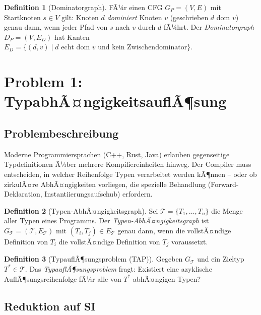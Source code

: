 ﻿\documentclass[a4paper,12pt]{article}
\theoremstyle{definition}
\newtheorem{definition}{Definition}
\begin{document}
\begin{definition}[Dominatorgraph]
\label{def:dom}
FÃ¼r einen CFG $G_P = (V, E)$ mit Startknoten $s \in V$ gilt: Knoten $d$ \emph{dominiert} Knoten $v$ (geschrieben $d \text{ dom } v$) genau dann, wenn jeder Pfad von $s$ nach $v$ durch $d$ fÃ¼hrt. Der \emph{Dominatorgraph} $D_P = (V, E_D)$ hat Kanten $E_D = \{(d, v) \mid d \text{ echt dom } v \text{ und kein Zwischendominator}\}$.
\end{definition}

\section{Problem 1: TypabhÃ¤ngigkeitsauflÃ¶sung}
\label{sec:typ}

\subsection{Problembeschreibung}

Moderne Programmiersprachen (C++, Rust, Java) erlauben gegenseitige Typdefinitionen Ã¼ber mehrere Kompiliereinheiten hinweg. Der Compiler muss entscheiden, in welcher Reihenfolge Typen verarbeitet werden kÃ¶nnen -- oder ob zirkulÃ¤re AbhÃ¤ngigkeiten vorliegen, die spezielle Behandlung (Forward-Deklaration, Instantiierungsaufschub) erfordern.

\begin{definition}[Typen-AbhÃ¤ngigkeitsgraph]
\label{def:tag}
Sei $\mathcal{T} = \{T_1, \ldots, T_n\}$ die Menge aller Typen eines Programms. Der \emph{Typen-AbhÃ¤ngigkeitsgraph} ist $G_{\mathcal{T}} = (\mathcal{T}, E_{\mathcal{T}})$ mit $(T_i, T_j) \in E_{\mathcal{T}}$ genau dann, wenn die vollstÃ¤ndige Definition von $T_i$ die vollstÃ¤ndige Definition von $T_j$ voraussetzt.
\end{definition}

\begin{definition}[TypauflÃ¶sungsproblem (TAP)]
\label{def:tap}
Gegeben $G_{\mathcal{T}}$ und ein Zieltyp $T^* \in \mathcal{T}$. Das \emph{TypauflÃ¶sungsproblem} fragt: Existiert eine azyklische AuflÃ¶sungsreihenfolge fÃ¼r alle von $T^*$ abhÃ¤ngigen Typen?
\end{definition}

\subsection{Reduktion auf SI}
\end{document}

